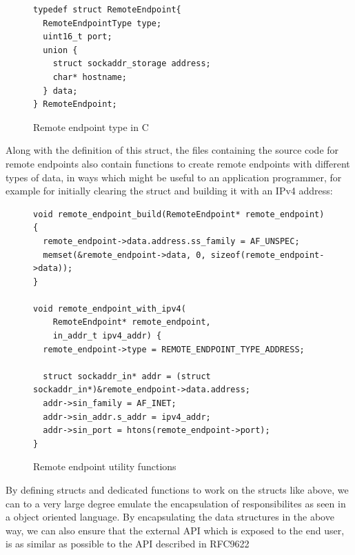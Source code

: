 \begin{figure}[H]
\begin{verbatim}
typedef struct RemoteEndpoint{
  RemoteEndpointType type;
  uint16_t port;
  union {
    struct sockaddr_storage address;
    char* hostname;
  } data;
} RemoteEndpoint;
\end{verbatim}
\caption{Remote endpoint type in C}
\end{figure}

Along with the definition of this struct, the files containing the
source code for remote endpoints also contain functions to create 
remote endpoints with different types of data, in ways which might be useful
to an application programmer, for example for initially clearing the struct
and building it with an IPv4 address:

\begin{figure}[H]
\begin{verbatim}
void remote_endpoint_build(RemoteEndpoint* remote_endpoint) {
  remote_endpoint->data.address.ss_family = AF_UNSPEC;
  memset(&remote_endpoint->data, 0, sizeof(remote_endpoint->data));
}

void remote_endpoint_with_ipv4(
    RemoteEndpoint* remote_endpoint, 
    in_addr_t ipv4_addr) {
  remote_endpoint->type = REMOTE_ENDPOINT_TYPE_ADDRESS;

  struct sockaddr_in* addr = (struct sockaddr_in*)&remote_endpoint->data.address;
  addr->sin_family = AF_INET;
  addr->sin_addr.s_addr = ipv4_addr;
  addr->sin_port = htons(remote_endpoint->port);
}
\end{verbatim} 
\caption{Remote endpoint utility functions}
\end{figure}

By defining structs and dedicated functions to work on the structs like
above, we can to a very large degree emulate the encapsulation of responsibilites
as seen in a object oriented language. By encapsulating the data structures in the
above way, we can also ensure that the external API which is exposed to the end user,
is as similar as possible to the API described in RFC9622 \cite{trammellAbstractApplicationProgramming2025}

